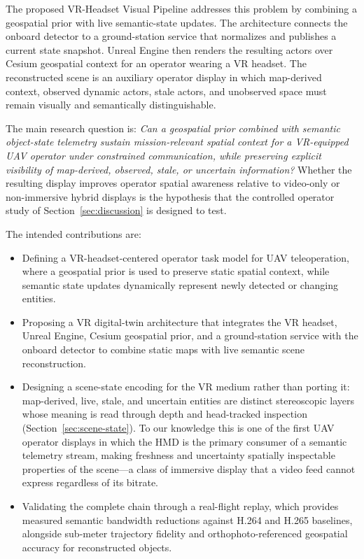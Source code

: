 \documentclass[fleqn]{VRIH2025}
\begin{document}
The proposed VR-Headset Visual Pipeline addresses this problem by combining a geospatial prior with live semantic-state updates. The architecture connects the onboard detector to a ground-station service that normalizes and publishes a current state snapshot. Unreal Engine then renders the resulting actors over Cesium geospatial context for an operator wearing a VR headset. The reconstructed scene is an auxiliary operator display in which map-derived context, observed dynamic actors, stale actors, and unobserved space must remain visually and semantically distinguishable.

The main research question is: \textit{Can a geospatial prior combined with semantic object-state telemetry sustain mission-relevant spatial context for a VR-equipped UAV operator under constrained communication, while preserving explicit visibility of map-derived, observed, stale, or uncertain information?} Whether the resulting display improves operator spatial awareness relative to video-only or non-immersive hybrid displays is the hypothesis that the controlled operator study of Section~\ref{sec:discussion} is designed to test.

The intended contributions are:
\begin{itemize}
    \item Defining a VR-headset-centered operator task model for UAV teleoperation, where a geospatial prior is used to preserve static spatial context, while semantic state updates dynamically represent newly detected or changing entities.
    \item Proposing a VR digital-twin architecture that integrates the VR headset, Unreal Engine, Cesium geospatial prior, and a ground-station service with the onboard detector to combine static maps with live semantic scene reconstruction.
    \item Designing a scene-state encoding for the VR medium rather than porting it: map-derived, live, stale, and uncertain entities are distinct stereoscopic layers whose meaning is read through depth and head-tracked inspection (Section~\ref{sec:scene-state}). To our knowledge this is one of the first UAV operator displays in which the HMD is the primary consumer of a semantic telemetry stream, making freshness and uncertainty spatially inspectable properties of the scene---a class of immersive display that a video feed cannot express regardless of its bitrate.
    \item Validating the complete chain through a real-flight replay, which provides measured semantic bandwidth reductions against H.264 and H.265 baselines, alongside sub-meter trajectory fidelity and orthophoto-referenced geospatial accuracy for reconstructed objects.
\end{itemize}
\end{document}
